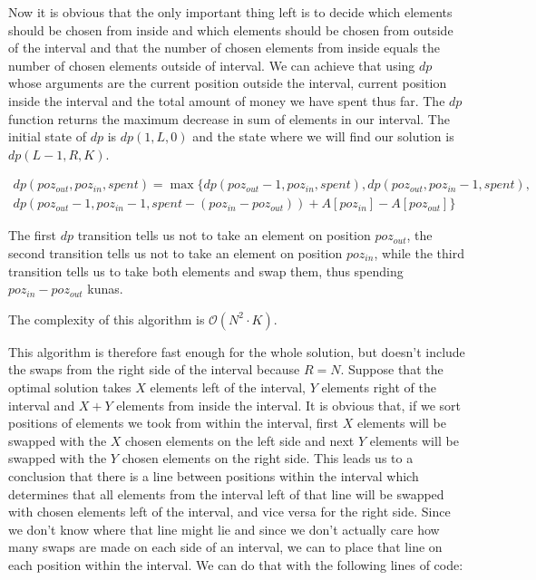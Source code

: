 \documentclass[a4paper]{article}
\begin{document}
Now it is obvious that the only important thing left is to decide which elements
should be chosen from inside and which elements should be chosen from outside
of the interval and that the number of chosen elements from inside equals the
number of chosen elements outside of interval. We can achieve that using $dp$
whose arguments are the current position outside the interval, current position
inside the interval and the total amount of money we have spent thus far. The
$dp$ function returns the maximum decrease in sum of elements in our interval.
The initial state of $dp$ is $dp(1, L, 0)$ and the state where we will find our
solution is $dp(L - 1, R, K)$.

\begin{multline}
  dp(poz_{out}, poz_{in}, spent) = \max \biggl\{ dp(poz_{out} - 1, poz_{in}, spent),
  dp(poz_{out}, poz_{in} - 1, spent),\\
  dp(poz_{out} - 1, poz_{in} - 1, spent - (poz_{in} - poz_{out})) + A[poz_{in}] - A[poz_{out}] \biggr\}
\end{multline}

The first $dp$ transition tells us not to take an element on position $poz_{out}$,
the second transition tells us not to take an element on position $poz_{in}$, while
the third transition tells us to take both elements and swap them, thus spending
$poz_{in} - poz_{out}$ kunas.

The complexity of this algorithm is $\mathcal{O}(N^2 \cdot K)$.

This algorithm is therefore fast enough for the whole solution, but doesn't
include the swaps from the right side of the interval because $R=N$. Suppose
that the optimal solution takes $X$ elements left of the interval, $Y$ elements
right of the interval and $X+Y$ elements from inside the interval. It is obvious
that, if we sort positions of elements we took from within the interval, first
$X$ elements will be swapped with the $X$ chosen elements on the left side and
next $Y$ elements will be swapped with the $Y$ chosen elements on the right side.
This leads us to a conclusion that there is a line between positions within the
interval which determines that all elements from the interval left of that line
will be swapped with chosen elements left of the interval, and vice versa for
the right side. Since we don't know where that line might lie and since we
don't actually care how many swaps are made on each side of an interval, we
can to place that line on each position within the interval. We can do that
with the following lines of code:
\end{document}
